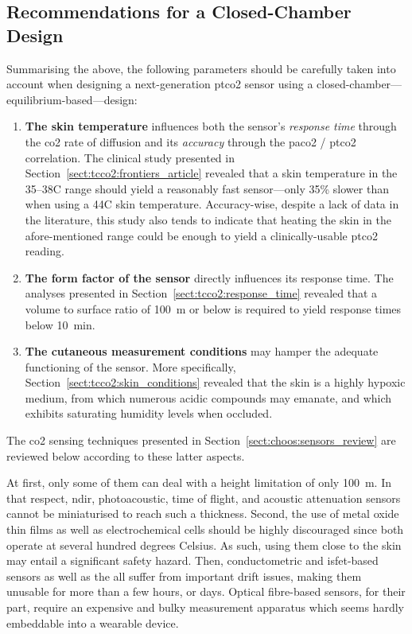 \subsection{Recommendations for a Closed-Chamber Design}

Summarising the above, the following parameters should be carefully taken into account when designing a next-generation \gls{ptco2} sensor using a closed-chamber---\aka{} equilibrium-based---design:
\begin{enumerate}
	\item \textbf{The skin temperature} influences both the sensor's \emph{response time} through the \gls{co2} rate of diffusion and its \emph{accuracy} through the \gls{paco2} / \gls{ptco2} correlation. The clinical study presented in Section~\ref{sect:tcco2:frontiers_article} revealed that a skin temperature in the 35--38{\degree}C range should yield a reasonably fast sensor---only 35\% slower than when using a 44{\degree}C skin temperature. Accuracy-wise, despite a lack of data in the literature, this study also tends to indicate that heating the skin in the afore-mentioned range could be enough to yield a clinically-usable \gls{ptco2} reading.
	\item \textbf{The form factor of the sensor} directly influences its response time. The analyses presented in Section~\ref{sect:tcco2:response_time} revealed that a volume to surface ratio of 100~\textmu{}m or below is required to yield response times below 10~min.
	\item \textbf{The cutaneous measurement conditions} may hamper the adequate functioning of the sensor. More specifically, Section~\ref{sect:tcco2:skin_conditions} revealed that the skin is a highly hypoxic medium, from which numerous acidic compounds may emanate, and which exhibits saturating humidity levels when occluded.
\end{enumerate}
The \gls{co2} sensing techniques presented in Section~\ref{sect:choos:sensors_review} are reviewed below according to these latter aspects.

At first, only some of them can deal with a height limitation of only 100~\textmu{}m. In that respect, \gls{ndir}, photoacoustic, time of flight, and acoustic attenuation sensors cannot be miniaturised to reach such a thickness. Second, the use of metal oxide thin films as well as electrochemical cells should be highly discouraged since both operate at several hundred degrees Celsius. As such, using them close to the skin may entail a significant safety hazard. Then, conductometric and \gls{isfet}-based sensors as well as the \ssel{} all suffer from important drift issues, making them unusable for more than a few hours, or days. Optical fibre-based sensors, for their part, require an expensive and bulky measurement apparatus which seems hardly embeddable into a wearable device.

